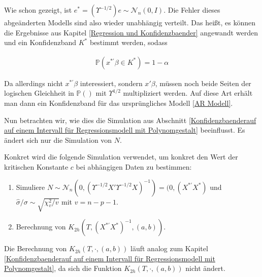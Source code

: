 \documentclass[12pt,a4paper]{article}
\theoremstyle{definition}
\theoremstyle{definition}
\theoremstyle{definition}
\theoremstyle{definition}
\begin{document}
Wie schon gezeigt, ist $e^{*} = (\Upsilon^{-1/2})e \sim \mathscr{N}_{n}(0,I)$. Die Fehler dieses abgeänderten Modells sind also wieder unabhängig verteilt. Das heißt, es können die Ergebnisse aus Kapitel \ref{Regression und Konfidenzbaender} angewandt werden und ein Konfidenzband $K^{*}$ bestimmt werden, sodass

\begin{align*}
\mathbb{P}(x^{*'} \beta \in K^{*}) = 1 - \alpha
\end{align*}

Da allerdings nicht $x^{*'} \beta$ interessiert, sondern $x' \beta$, müssen noch beide Seiten der logischen Gleichheit in $\mathbb{P}()$ mit $\Upsilon^{1/2}$ multipliziert werden. Auf diese Art erhält man dann ein Konfidenzband für das ursprüngliches Modell \eqref{AR Modell}.

Nun betrachten wir, wie dies die Simulation aus Abschnitt \ref{Konfidenzbaenderauf auf einem Intervall für Regressionsmodell mit Polynomgestalt} beeinflusst. Es ändert sich nur die Simulation von $N$.

Konkret wird die folgende Simulation verwendet, um konkret den Wert der kritischen Konstante $c$ bei abhängigen Daten zu bestimmen:

\begin{enumerate}
\item Simuliere $N \sim \mathscr{N}_{n}(0,(\Upsilon^{-1/2}X'\Upsilon^{-1/2}X)^{-1}) = (0,(X^{*'}X^{*})$ und $\hat{\sigma}/\sigma \sim \sqrt{\chi^2_v/v}$ mit $v=n-p-1$.
\item Berechnung von $K_{2h}(T,(X^{*'}X^{*})^{-1},(a,b))$.
\end{enumerate}

Die Berechnung von $K_{2h}(T,\cdot,(a,b))$ läuft analog zum Kapitel \ref{Konfidenzbaenderauf auf einem Intervall für Regressionsmodell mit Polynomgestalt}, da sich die Funktion $K_{2h}(T,\cdot,(a,b))$ nicht ändert.
\end{document}
